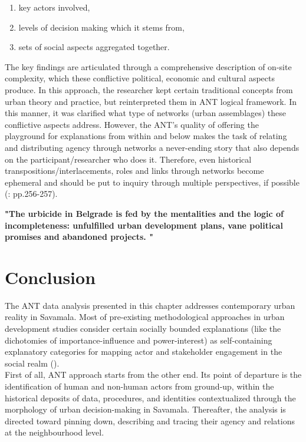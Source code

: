 \documentclass[11pt]{report}
\begin{document}
\begin{enumerate}
\item key actors involved,
\item levels of decision making which it stems from,
\item sets of social aspects aggregated together.
\end{enumerate}

The key findings are articulated through a comprehensive description of on-site complexity, which these conflictive political, economic and cultural aspects produce.
In this approach, the researcher kept certain traditional concepts from urban theory and practice, but reinterpreted them in ANT logical framework.
In this manner, it was clarified what type of networks (urban assemblages) these conflictive aspects address.
However, the ANT's quality of offering the playground for explanations from within and below makes the task of relating and distributing agency through networks a never-ending story that also depends on the participant/researcher who does it. Therefore, even historical transpositions/interlacements, roles and links through networks become ephemeral and should be put to inquiry through multiple perspectives, if possible (\href{ref}{\citealt{latour_reassembling_2005}}: pp.256-257).

\textbf{"The  urbicide  in  Belgrade  is  fed  by  the  mentalities and  the  logic  of  incompleteness:  unfulfilled  urban development  plans,  vane  political  promises  and abandoned  projects. \href{ref}{\citealt{doytchinov_belgrade_2015}}"}

\section{Conclusion}

The ANT data analysis presented in this chapter addresses contemporary urban reality in Savamala.
Most of pre-existing methodological approaches in urban development studies consider certain socially bounded explanations (like the dichotomies of importance-influence and power-interest) as self-containing explanatory categories for mapping actor and stakeholder engagement in the social realm (\href{ref}{\citealt{mathur_defining_2007}}).
\\

First of all, ANT approach starts from the other end.
Its point of departure is the identification of human and non-human actors from ground-up, within the historical deposits of data, procedures, and identities contextualized through the morphology of urban decision-making in Savamala.
Thereafter, the analysis is directed toward pinning down, describing and tracing  their agency and relations at the neighbourhood level.
\\
\end{document}
